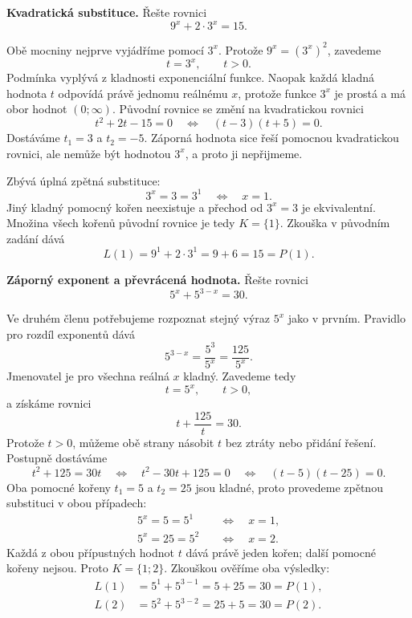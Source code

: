 \documentclass[12pt,a4paper]{article}
\begin{document}
\begin{examplebox}
\textbf{Kvadratická substituce.}
Řešte rovnici
\[
    9^x+2\cdot3^x=15.
\]

Obě mocniny nejprve vyjádříme pomocí $3^x$. Protože $9^x=(3^x)^2$, zavedeme
\[
    t=3^x,\qquad t>0.
\]
Podmínka vyplývá z kladnosti exponenciální funkce. Naopak každá kladná hodnota $t$
odpovídá právě jednomu reálnému $x$, protože funkce $3^x$ je prostá a má obor hodnot $(0;\infty)$.
Původní rovnice se změní na kvadratickou rovnici
\[
    t^2+2t-15=0
    \quad\Longleftrightarrow\quad
    (t-3)(t+5)=0.
\]
Dostáváme $t_1=3$ a $t_2=-5$.
Záporná hodnota sice řeší pomocnou kvadratickou rovnici, ale nemůže být hodnotou $3^x$,
a proto ji nepřijmeme.

Zbývá úplná zpětná substituce:
\[
    3^x=3=3^1\quad\Longleftrightarrow\quad x=1.
\]
Jiný kladný pomocný kořen neexistuje a přechod od $3^x=3$ je ekvivalentní.
Množina všech kořenů původní rovnice je tedy $K=\{1\}$.
Zkouška v původním zadání dává
\[
    L(1)=9^1+2\cdot3^1=9+6=15=P(1).
\]
\end{examplebox}

\begin{examplebox}
\textbf{Záporný exponent a převrácená hodnota.}
Řešte rovnici
\[
    5^x+5^{3-x}=30.
\]

Ve druhém členu potřebujeme rozpoznat stejný výraz $5^x$ jako v prvním.
Pravidlo pro rozdíl exponentů dává
\[
    5^{3-x}=\frac{5^3}{5^x}=\frac{125}{5^x}.
\]
Jmenovatel je pro všechna reálná $x$ kladný. Zavedeme tedy
\[
    t=5^x,\qquad t>0,
\]
a získáme rovnici
\[
    t+\frac{125}{t}=30.
\]
Protože $t>0$, můžeme obě strany násobit $t$ bez ztráty nebo přidání řešení.
Postupně dostáváme
\[
    t^2+125=30t
    \quad\Longleftrightarrow\quad
    t^2-30t+125=0
    \quad\Longleftrightarrow\quad
    (t-5)(t-25)=0.
\]
Oba pomocné kořeny $t_1=5$ a $t_2=25$ jsou kladné, proto provedeme zpětnou substituci v obou případech:
\[
\begin{aligned}
    5^x=5=5^1&\quad\Longleftrightarrow\quad x=1,\\
    5^x=25=5^2&\quad\Longleftrightarrow\quad x=2.
\end{aligned}
\]
Každá z obou přípustných hodnot $t$ dává právě jeden kořen; další pomocné kořeny nejsou.
Proto $K=\{1;2\}$.
Zkouškou ověříme oba výsledky:
\[
\begin{aligned}
    L(1)&=5^1+5^{3-1}=5+25=30=P(1),\\
    L(2)&=5^2+5^{3-2}=25+5=30=P(2).
\end{aligned}
\]
\end{examplebox}
\end{document}
